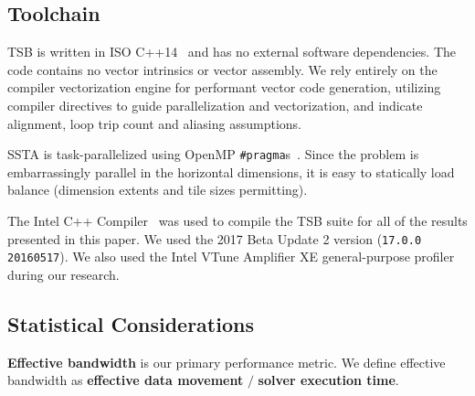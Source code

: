 \documentclass[10pt, conference, compsocconf]{IEEEtran}
\begin{document}
\subsection{Toolchain}
\label{sec:setup:toolchain}

TSB is written in ISO C++14~\cite{cxx14_spec} and has no external software
  dependencies.
The code contains no vector intrinsics or vector assembly.
We rely entirely on the compiler vectorization engine for performant vector
  code generation, utilizing compiler directives to guide parallelization and
  vectorization, and indicate alignment, loop trip count and aliasing
  assumptions.

SSTA is task-parallelized using OpenMP \lstinline{#pragma}s~\cite{openmp_spec}.
Since the problem is embarrassingly parallel in the horizontal dimensions, it
  is easy to statically load balance (dimension extents and tile sizes
  permitting).

The Intel C++ Compiler~\cite{intel_cpp_compiler} was used to compile the TSB
  suite for all of the results presented in this paper.
We used the 2017 Beta Update 2 version (\lstinline{17.0.0 20160517}).
We also used the Intel VTune Amplifier XE general-purpose
  profiler~\cite{intel_vtune_amplifier} during our research.

\subsection{Statistical Considerations}
\label{sec:setup:stats}

\textbf{Effective bandwidth} is our primary performance metric.
We define effective bandwidth as \textbf{effective data movement} \(/\)
  \textbf{solver execution time}.
\end{document}
